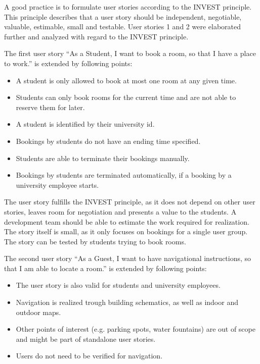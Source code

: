 \documentclass[conference,onecolumn]{IEEEtran}
\begin{document}
A good practice is to formulate user stories according to the INVEST principle.
This principle describes that a user story should be independent, negotiable, valuable, estimable, small and testable.
User stories 1 and 2 were elaborated further and analyzed with regard to the INVEST principle.

The first user story ``As a Student, I want to book a room, so that I have a place to work.'' is extended by following points:

\begin{itemize}
	\item A student is only allowed to book at most one room at any given time.
	\item Students can only book rooms for the current time and are not able to reserve them for later.
	\item A student is identified by their university id.
	\item Bookings by students do not have an ending time specified.
	\item Students are able to terminate their bookings manually.
	\item Bookings by students are terminated automatically, if a booking by a university employee starts.
\end{itemize}

The user story fulfills the INVEST principle, as it does not depend on other user stories, leaves room for negotiation and presents a value to the students.
A development team should be able to estimate the work required for realization. The story itself is small, as it only focuses on bookings for a single user group.
The story can be tested by students trying to book rooms.

The second user story ``As a Guest, I want to have navigational instructions, so that I am able to locate a room.'' is extended by following points:

\begin{itemize}
	\item The user story is also valid for students and university employees.
	\item Navigation is realized trough  building schematics, as well as indoor and outdoor maps.
	\item Other points of interest (e.g. parking spots, water fountains) are out of scope and might be part of standalone user stories.
	\item Users do not need to be verified for navigation.
\end{itemize}
\end{document}
